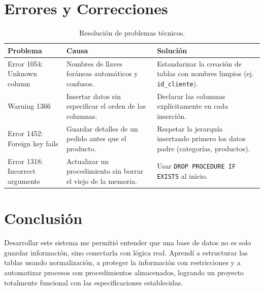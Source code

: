 \documentclass[10pt,letterpaper]{article}
\begin{document}
\section{Errores y Correcciones}
\begin{table}[H]
    \centering
    \begin{tabularx}{\textwidth}{|l|X|X|}
    \hline
    \textbf{Problema} & \textbf{Causa} & \textbf{Solución} \\ \hline
    Error 1054: Unknown column & Nombres de llaves foráneas automáticos y confusos. & Estandarizar la creación de tablas con nombres limpios (ej. \texttt{id\_cliente}). \\ \hline
    Warning 1366 & Insertar datos sin especificar el orden de las columnas. & Declarar las columnas explícitamente en cada inserción. \\ \hline
    Error 1452: Foreign key fails & Guardar detalles de un pedido antes que el producto. & Respetar la jerarquía insertando primero los datos padre (categorías, productos). \\ \hline
    Error 1318: Incorrect arguments & Actualizar un procedimiento sin borrar el viejo de la memoria. & Usar \texttt{DROP PROCEDURE IF EXISTS} al inicio. \\ \hline
    \end{tabularx}
    \caption{Resolución de problemas técnicos.}
\end{table}


\section{Conclusión}
Desarrollar este sistema me permitió entender que una base de datos no es
 solo guardar información, sino conectarla con lógica real. Aprendí a 
 estructurar las tablas usando normalización, a proteger la información
  con restricciones y a automatizar procesos con procedimientos almacenados,
   logrando un proyecto totalmente funcional con las especificaciones establecidas.
\end{document}
